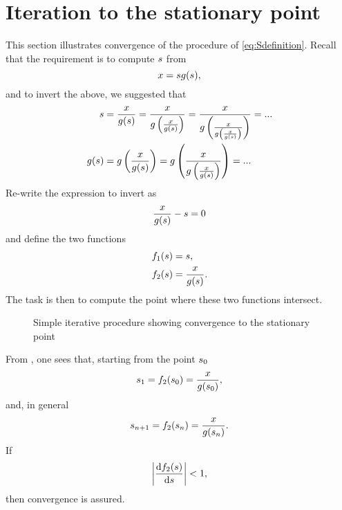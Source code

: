 \section{Iteration to the stationary point}
\label{sc:stationaryIteration}
This section illustrates convergence of the procedure of \eqref{eq:Sdefinition}. Recall that the requirement is to compute $s$ from
\begin{equation}
 x = sg(s),
\end{equation}
and to invert the above, we suggested that
\begin{equation}
\begin{split}
 s &= \frac{x}{g(s)} = \frac{x}{g\left(\frac{x}{g(s)}\right)} = \frac{x}{g\left(\frac{x}{g\left(\frac{x}{g(s)}\right)}\right)} = ...\\
 g(s) &= g\left(\frac{x}{g(s)}\right) = g\left(\frac{x}{g\left(\frac{x}{g(s)}\right)}\right) = ...
\end{split}
\end{equation}
Re-write the expression to invert as
\begin{equation}
 \frac{x}{g(s)} - s = 0
\end{equation}
and define the two functions
\begin{align}
 f_1(s) &= s,\\
 f_2(s) &= \frac{x}{g(s)}.
\end{align}
The task is then to compute the point where these two functions intersect.
\begin{figure}[ht!]
    \begin{center}
    \resizebox{0.5\textwidth}{!}{}
	\caption{Simple iterative procedure showing convergence to the stationary point}
	\label{fg:stationaryiteration}
	\end{center}
\end{figure}
From , one sees that, starting from the point $s_0$
\begin{equation}
 s_1 = f_2(s_0) = \frac{x}{g(s_0)},
\end{equation}
and, in general
\begin{equation}
 s_{n+1} = f_2(s_n) = \frac{x}{g(s_n)}.
\end{equation}
If 
\begin{equation} 
    \left\lvert \frac{\text{d}f_2(s)}{\text{d}s}\right\rvert < 1,
\end{equation}
then convergence is assured.
